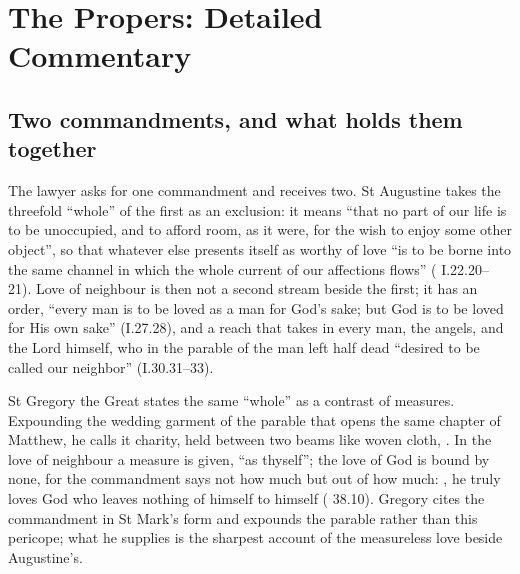 
\section{The Propers: Detailed Commentary}

\subsection{Two commandments, and what holds them together}

The lawyer asks for one commandment and receives two. St Augustine takes the
threefold ``whole'' of the first as an exclusion: it means ``that no part of
our life is to be unoccupied, and to afford room, as it were, for the wish to
enjoy some other object'', so that whatever else presents
itself as worthy of love ``is to be borne into the same channel in which the
whole current of our affections flows'' (
I.22.20--21). Love of neighbour is then not a second stream beside the first;
it has an order, ``every man is to be loved as a man for God's sake; but God is
to be loved for His own sake'' (I.27.28), and a reach that takes in every man,
the angels, and the Lord himself, who in the parable of the man left half dead
``desired to be called our neighbor'' (I.30.31--33).

St Gregory the Great states the same ``whole'' as a contrast of measures.
Expounding the wedding garment of the parable that opens the same chapter of
Matthew, he calls it charity, held between two beams like woven
cloth, . In the love of neighbour a
measure is given, ``as thyself''; the love of God is bound by none, for the
commandment says not how much but out of how much: , he truly loves God who leaves
nothing of himself to himself ( 38.10). Gregory
cites the commandment in St Mark's form and expounds the parable rather than
this pericope; what he supplies is the sharpest account of the measureless
love beside Augustine's.

